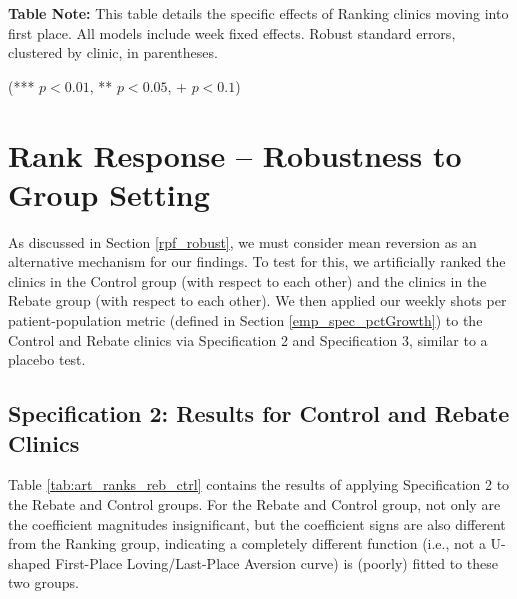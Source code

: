 \begin{table}
{\begin{threeparttable}[t]
    \medskip
    \begin{tablenotes}
      \footnotesize
      \item \textbf{Table Note:} This table details the specific effects of Ranking clinics moving into first place. All models include week fixed effects. Robust standard errors, clustered by clinic, in parentheses.
      \item (*** $p < 0.01$, ** $p < 0.05$, + $p < 0.1$)
    \end{tablenotes}
  \label{tab:sensitivity_def_first}
  \end{threeparttable} }
 \end{table}

\newpage
\section{Rank Response – Robustness to Group Setting} \label{app_cc_grp_robust}
As discussed in Section \ref{rpf_robust}, we must consider mean reversion as an alternative mechanism for our findings. To test for this, we artificially ranked the clinics in the Control group (with respect to each other) and the clinics in the Rebate group (with respect to each other). We then applied our weekly shots per patient-population metric (defined in Section \ref{emp_spec_pctGrowth}) to the Control and Rebate clinics via Specification 2 and Specification 3, similar to a placebo test. 
\subsection{Specification 2: Results for Control and Rebate Clinics}
Table \ref{tab:art_ranks_reb_ctrl} contains the results of applying Specification 2 to the Rebate and Control groups. For the Rebate and Control group, not only are the coefficient magnitudes insignificant, but the coefficient signs are also different from the Ranking group, indicating a completely different function (i.e., not a U-shaped First-Place Loving/Last-Place Aversion curve) is (poorly) fitted to these two groups.

